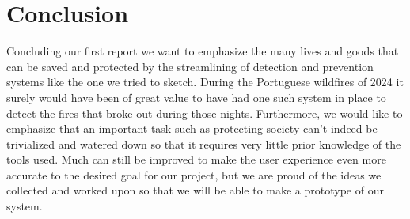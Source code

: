 \chapter{Conclusion}
Concluding our first report we want to emphasize the many lives and goods that can be saved and protected by the streamlining of detection and prevention systems like the one we tried to sketch. During the Portuguese wildfires of 2024 it surely would have been of great value to have had one such system in place to detect the fires that broke out during those nights. Furthermore, we would like to emphasize that an important task such as protecting society can’t indeed be trivialized and watered down so that it requires very little prior knowledge of the tools used. Much can still be improved to make the user experience even more accurate to the desired goal for our project, but we are proud of the ideas we collected and worked upon so that we will be able to make a prototype of our system.
